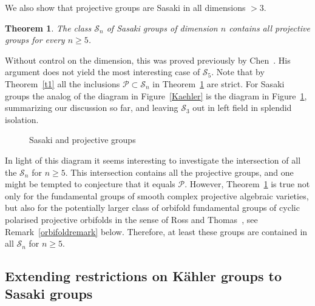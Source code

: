 \documentclass[12pt,leqno]{amsart}
\newcommand{\Pg}{\mathcal{P}}
\newcommand{\Sg}{\mathcal{S}}
\newtheorem{theor}{Theorem}
\begin{document}
We also show that projective groups are Sasaki in all dimensions $>3$.
\begin{theor}\label{t3}
The class $\Sg_{n}$ of Sasaki groups of dimension $n$ contains all projective 
groups for every $n\geq 5$. 
\end{theor}
Without control on the dimension, this was proved previously
by Chen~\cite[Proposition~1.2.]{Chen}. His argument does not yield the most interesting case of $\Sg_5$.
Note that by Theorem~\ref{t1} all the inclusions $\Pg\subset\Sg_{n}$ in Theorem~\ref{t3} are strict.
For Sasaki groups the analog of the diagram in Figure~\ref{Kaehler} is the diagram in Figure~\ref{Sasaki}, 
summarizing our discussion so far, and leaving $\Sg_3$ out in left field in splendid isolation.
\begin{figure} 
\caption{Sasaki and projective groups}\label{Sasaki}
\end{figure}
In light of this diagram it seems interesting to investigate the intersection of all the $\Sg_n$ for $n\geq 5$.
This intersection contains all the projective groups, and one might be tempted to conjecture that it equals $\Pg$. 
However, Theorem~\ref{t3} is true not only for the fundamental groups of smooth complex projective algebraic 
varieties, but also for the potentially larger class of orbifold fundamental groups of cyclic polarised projective 
orbifolds in the sense of Ross and Thomas~\cite[Definition~2.7.]{RT}, see Remark~\ref{orbifoldremark} below. 
Therefore, at least these groups are contained in all $\Sg_n$ for $n\geq 5$.

\subsection{Extending restrictions on K\"ahler groups to Sasaki groups}
\end{document}
